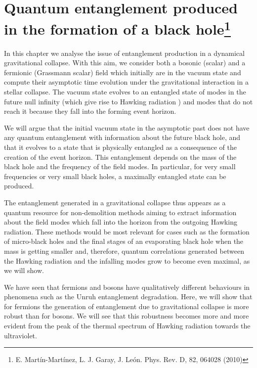 \chapter{Quantum entanglement produced in the formation of a black hole\footnote{E. Mart\'in-Mart\'inez, L. J. Garay, J. Le\'on. Phys. Rev. D, 82, 064028 (2010)}}\label{stellarcollapse}


In this chapter we analyse the issue of entanglement production in a
dynamical gravitational collapse. With this aim, we consider both a bosonic
(scalar) and a fermionic (Grassmann scalar) field which initially are  in the
vacuum state and compute their asymptotic time evolution under   the
gravitational interaction in a stellar collapse. The vacuum state  evolves to
an  entangled state of  modes in the future null infinity (which give rise to
Hawking radiation \cite{Hawking}) and modes that do not reach it
because they fall into the forming event horizon.


We will argue that the initial vacuum state  in the asymptotic past does
not have any quantum entanglement with information about the future black hole, and that it evolves to a state
that is physically entangled  as a consequence of the creation of the
event horizon. This entanglement depends on the mass of the black hole
and the frequency of the field modes. In particular, for very small
frequencies or very small black holes, a maximally entangled state can
be produced.


The entanglement generated in a gravitational collapse thus
appears as a quantum resource for non-demolition methods aiming to
extract information about the field modes which fall into the horizon
from the outgoing Hawking radiation. These methods would be most
relevant for cases such as the formation of micro-black holes and the
final stages of an evaporating black hole when the mass is getting smaller
and, therefore, quantum correlations generated between the Hawking
radiation and the infalling modes grow to become even maximal, as we will show.

We have seen that fermions and bosons  have qualitatively
different behaviours in phenomena such as the Unruh entanglement
degradation.
Here, we will show that for fermions the generation of entanglement due
to gravitational collapse is more robust than for bosons. We will see that this robustness
becomes more and more evident from the peak of the thermal spectrum of Hawking
radiation towards the ultraviolet.



